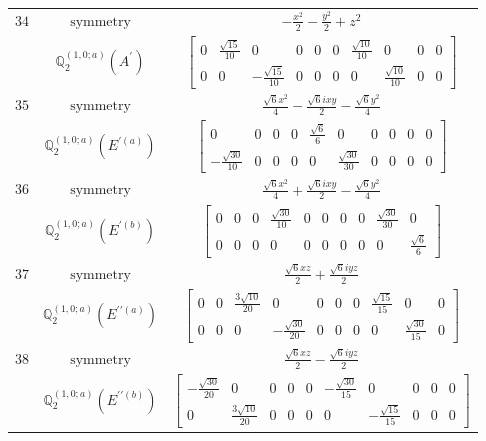 \documentclass[fleqn,8pt,landscape]{jsarticle}
\begin{document}
\begin{longtable}{ccc}
$ 34 $ & $ \text{symmetry} $ & $ - \frac{x^{2}}{2} - \frac{y^{2}}{2} + z^{2} $ \\
$  $ & $ \mathbb{Q}_{2}^{(1,0;a)}(A^{\prime}) $ & $ \begin{bmatrix} 0 & \frac{\sqrt{15}}{10} & 0 & 0 & 0 & 0 & \frac{\sqrt{10}}{10} & 0 & 0 & 0 \\ 0 & 0 & - \frac{\sqrt{15}}{10} & 0 & 0 & 0 & 0 & \frac{\sqrt{10}}{10} & 0 & 0 \end{bmatrix} $ \\ \hline
$ 35 $ & $ \text{symmetry} $ & $ \frac{\sqrt{6} x^{2}}{4} - \frac{\sqrt{6} i x y}{2} - \frac{\sqrt{6} y^{2}}{4} $ \\
$  $ & $ \mathbb{Q}_{2}^{(1,0;a)}(E^{\prime(a)}) $ & $ \begin{bmatrix} 0 & 0 & 0 & 0 & \frac{\sqrt{6}}{6} & 0 & 0 & 0 & 0 & 0 \\ - \frac{\sqrt{30}}{10} & 0 & 0 & 0 & 0 & \frac{\sqrt{30}}{30} & 0 & 0 & 0 & 0 \end{bmatrix} $ \\ \hline
$ 36 $ & $ \text{symmetry} $ & $ \frac{\sqrt{6} x^{2}}{4} + \frac{\sqrt{6} i x y}{2} - \frac{\sqrt{6} y^{2}}{4} $ \\
$  $ & $ \mathbb{Q}_{2}^{(1,0;a)}(E^{\prime(b)}) $ & $ \begin{bmatrix} 0 & 0 & 0 & \frac{\sqrt{30}}{10} & 0 & 0 & 0 & 0 & \frac{\sqrt{30}}{30} & 0 \\ 0 & 0 & 0 & 0 & 0 & 0 & 0 & 0 & 0 & \frac{\sqrt{6}}{6} \end{bmatrix} $ \\ \hline
$ 37 $ & $ \text{symmetry} $ & $ \frac{\sqrt{6} x z}{2} + \frac{\sqrt{6} i y z}{2} $ \\
$  $ & $ \mathbb{Q}_{2}^{(1,0;a)}(E^{\prime\prime(a)}) $ & $ \begin{bmatrix} 0 & 0 & \frac{3 \sqrt{10}}{20} & 0 & 0 & 0 & 0 & \frac{\sqrt{15}}{15} & 0 & 0 \\ 0 & 0 & 0 & - \frac{\sqrt{30}}{20} & 0 & 0 & 0 & 0 & \frac{\sqrt{30}}{15} & 0 \end{bmatrix} $ \\ \hline
$ 38 $ & $ \text{symmetry} $ & $ \frac{\sqrt{6} x z}{2} - \frac{\sqrt{6} i y z}{2} $ \\
$  $ & $ \mathbb{Q}_{2}^{(1,0;a)}(E^{\prime\prime(b)}) $ & $ \begin{bmatrix} - \frac{\sqrt{30}}{20} & 0 & 0 & 0 & 0 & - \frac{\sqrt{30}}{15} & 0 & 0 & 0 & 0 \\ 0 & \frac{3 \sqrt{10}}{20} & 0 & 0 & 0 & 0 & - \frac{\sqrt{15}}{15} & 0 & 0 & 0 \end{bmatrix} $ \\ \hline

\end{longtable}
\end{document}
